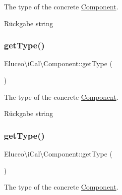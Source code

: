 The type of the concrete \mbox{\hyperlink{class_eluceo_1_1i_cal_1_1_component}{Component}}.

\begin{DoxyReturn}{Rückgabe}
string 
\end{DoxyReturn}
\mbox{\label{class_eluceo_1_1i_cal_1_1_component_aa6d20c67a9852dd5ca7951c996a98418}} 
\subsubsection{\texorpdfstring{get\+Type()}{getType()}\hspace{0.1cm}{\footnotesize\ttfamily [2/3]}}
{\footnotesize\ttfamily Eluceo\textbackslash{}i\+Cal\textbackslash{}\+Component\+::get\+Type (\begin{DoxyParamCaption}{ }\end{DoxyParamCaption})\hspace{0.3cm}{\ttfamily [abstract]}}

The type of the concrete \mbox{\hyperlink{class_eluceo_1_1i_cal_1_1_component}{Component}}.

\begin{DoxyReturn}{Rückgabe}
string 
\end{DoxyReturn}
\mbox{\label{class_eluceo_1_1i_cal_1_1_component_aa6d20c67a9852dd5ca7951c996a98418}} 
\subsubsection{\texorpdfstring{get\+Type()}{getType()}\hspace{0.1cm}{\footnotesize\ttfamily [3/3]}}
{\footnotesize\ttfamily Eluceo\textbackslash{}i\+Cal\textbackslash{}\+Component\+::get\+Type (\begin{DoxyParamCaption}{ }\end{DoxyParamCaption})\hspace{0.3cm}{\ttfamily [abstract]}}

The type of the concrete \mbox{\hyperlink{class_eluceo_1_1i_cal_1_1_component}{Component}}.

